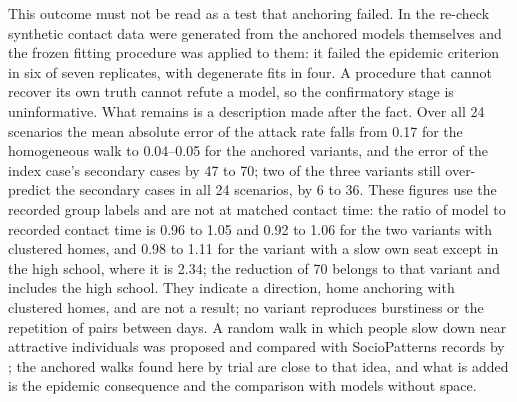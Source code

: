 This outcome must not be read as a test that anchoring failed. In the re-check synthetic
contact data were generated from the anchored models themselves and the frozen fitting procedure was applied to
them: it failed
the epidemic criterion in six of seven replicates, with degenerate fits in four. A procedure that cannot
recover its own truth cannot refute a model, so the confirmatory stage is uninformative. What remains is a
description made after the fact. Over all 24 scenarios the mean absolute error of the attack rate falls from
0.17 for the homogeneous walk to 0.04--0.05 for the anchored variants, and the error of the index case's
secondary cases by 47 to 70\pct{}; two of the three variants still over-predict the secondary cases in all 24
scenarios, by 6 to 36\pct{}. These figures use the recorded group labels and are not at matched contact
time: the ratio of model to recorded contact time is 0.96 to 1.05 and 0.92 to 1.06 for the two variants with
clustered homes, and 0.98 to 1.11 for the variant with a slow own seat except in the high school, where it is
2.34; the reduction of 70\pct{} belongs to that variant and includes the high school. They indicate a
direction, home anchoring with clustered homes, and are not a result; no variant reproduces burstiness or the
repetition of pairs between days. A random walk in which people slow down near attractive individuals was
proposed and compared with SocioPatterns records by \citet{starnini2013modeling}; the anchored walks found here
by trial are close to that idea, and what is added is the epidemic consequence and the comparison with models
without space.

